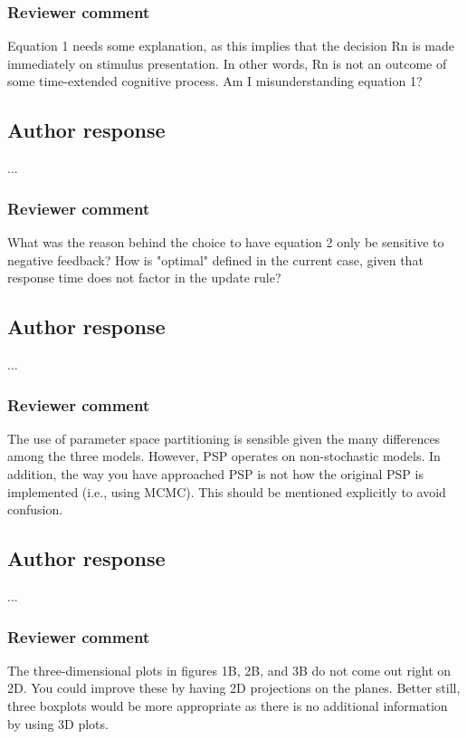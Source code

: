 \documentclass[12pt]{article}
\begin{document}
\subsubsection{Reviewer comment}
Equation 1 needs some explanation, as this implies that the
decision Rn is made immediately on stimulus presentation. In
other words, Rn is not an outcome of some time-extended
cognitive process. Am I misunderstanding equation 1?

\subsection{Author response}
...

\subsubsection{Reviewer comment}
What was the reason behind the choice to have equation 2
only be sensitive to negative feedback? How is "optimal"
defined in the current case, given that response time does
not factor in the update rule?

\subsection{Author response}
...

\subsubsection{Reviewer comment}
The use of parameter space partitioning is sensible given
the many differences among the three models. However, PSP
operates on non-stochastic models. In addition, the way you
have approached PSP is not how the original PSP is
implemented (i.e., using MCMC). This should be mentioned
explicitly to avoid confusion.

\subsection{Author response}
...

\subsubsection{Reviewer comment}
The three-dimensional plots in figures 1B, 2B, and 3B do not
come out right on 2D. You could improve these by having 2D
projections on the planes. Better still, three boxplots
would be more appropriate as there is no additional
information by using 3D plots.
\end{document}
